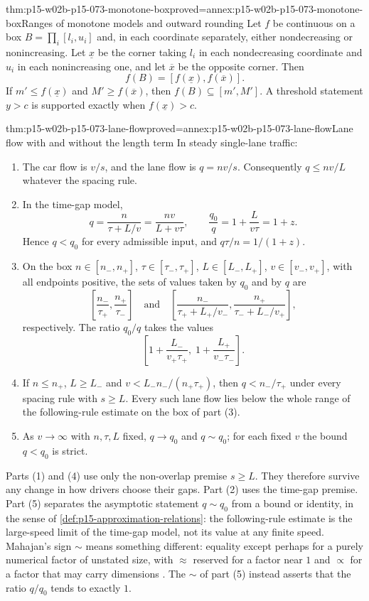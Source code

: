 \begin{hblemma}{thm:p15-w02b-p15-073-monotone-box}{proved=annex:p15-w02b-p15-073-monotone-box}{Ranges of monotone models and outward rounding}
Let \(f\) be continuous on a box \(B=\prod_i[l_i,u_i]\) and, in each
coordinate separately, either nondecreasing or nonincreasing.
Let \(\underline x\) be the corner taking \(l_i\) in each nondecreasing
coordinate and \(u_i\) in each nonincreasing one, and let \(\overline x\) be
the opposite corner. Then
\[
 f(B)=[f(\underline x),f(\overline x)].
\]
If \(m'\leq f(\underline x)\) and \(M'\geq f(\overline x)\), then
\(f(B)\subseteq[m',M']\). A threshold statement \(y>c\) is supported exactly
when \(f(\underline x)>c\).
\end{hblemma}

\begin{hbtheorem}{thm:p15-w02b-p15-073-lane-flow}{proved=annex:p15-w02b-p15-073-lane-flow}{Lane flow with and without the length term}
In steady single-lane traffic:
\begin{enumerate}
\item The car flow is \(v/s\), and the lane flow is \(q=nv/s\).
Consequently \(q\leq nv/L\) whatever the spacing rule.
\item In the time-gap model,
\[
 q=\frac{n}{\tau+L/v}=\frac{nv}{L+v\tau},\qquad
 \frac{q_0}{q}=1+\frac{L}{v\tau}=1+z .
\]
Hence \(q<q_0\) for every admissible input, and \(q\tau/n=1/(1+z)\).
\item On the box \(n\in[n_-,n_+]\), \(\tau\in[\tau_-,\tau_+]\),
\(L\in[L_-,L_+]\), \(v\in[v_-,v_+]\), with all endpoints positive,
the sets of values taken by \(q_0\) and by \(q\) are
\[
 \left[\frac{n_-}{\tau_+},\frac{n_+}{\tau_-}\right]
 \quad\text{and}\quad
 \left[\frac{n_-}{\tau_++L_+/v_-},\frac{n_+}{\tau_-+L_-/v_+}\right],
\]
respectively. The ratio \(q_0/q\) takes the values
\[
 \left[1+\frac{L_-}{v_+\tau_+},\;1+\frac{L_+}{v_-\tau_-}\right].
\]
\item If \(n\leq n_+\), \(L\geq L_-\) and
\(v<L_-n_-/(n_+\tau_+)\), then \(q<n_-/\tau_+\) under every spacing rule
with \(s\geq L\). Every such lane flow lies below the whole range of the
following-rule estimate on the box of part (3).
\item As \(v\to\infty\) with \(n,\tau,L\) fixed, \(q\to q_0\) and
\(q\sim q_0\); for each fixed \(v\) the bound \(q<q_0\) is strict.
\end{enumerate}
\end{hbtheorem}

Parts (1) and (4) use only the non-overlap premise \(s\geq L\). They therefore
survive any change in how drivers choose their gaps. Part (2) uses the
time-gap premise. Part (5) separates the asymptotic statement
\(q\sim q_0\) from a bound or identity, in the sense of
\cref{def:p15-approximation-relations}: the following-rule estimate is the
large-speed limit of the time-gap model, not its value at any finite speed.
Mahajan's sign \(\sim\) means something different: equality except perhaps for
a purely numerical factor of unstated size, with \(\approx\) reserved for a
factor near \(1\) and \(\propto\) for a factor that may carry dimensions
\cite[Sec.~1.1, p.~5]{Mahajan2014Insight}. The \(\sim\) of part (5) instead
asserts that the ratio \(q/q_0\) tends to exactly \(1\).

